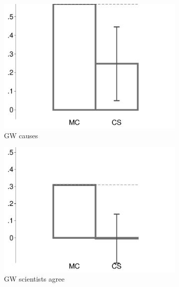 \begin{figure}[t]
\begin{subfigure}{.325\textwidth}
		\includegraphics[width=\textwidth]{../figs/confidence_score_ccd_cud_rw_increase_study1.pdf}
		\caption{GW causes}
	\end{subfigure}	
	\hfill
	\begin{subfigure}{.325\textwidth}\centering
		\includegraphics[width=\textwidth]{../figs/confidence_score_ccd_cud_rw_science_study1.pdf}
		\caption{GW scientists agree}
	\end{subfigure}	
	\begin{subfigure}{.325\textwidth}\centering

\end{subfigure}
\end{figure}

